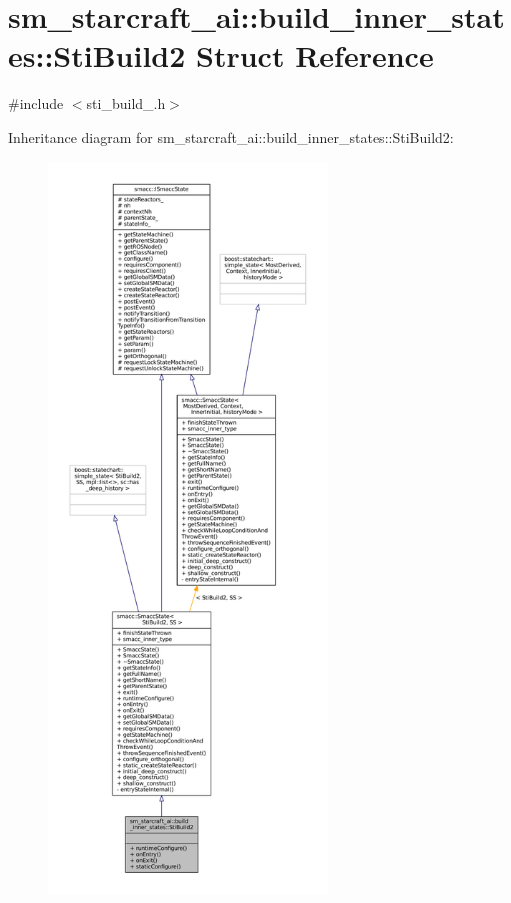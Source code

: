 \hypertarget{structsm__starcraft__ai_1_1build__inner__states_1_1StiBuild2}{}\section{sm\+\_\+starcraft\+\_\+ai\+:\+:build\+\_\+inner\+\_\+states\+:\+:Sti\+Build2 Struct Reference}
\label{structsm__starcraft__ai_1_1build__inner__states_1_1StiBuild2}


{\ttfamily \#include $<$sti\+\_\+build\+\_.\+h$>$}



Inheritance diagram for sm\+\_\+starcraft\+\_\+ai\+:\+:build\+\_\+inner\+\_\+states\+:\+:Sti\+Build2\+:
\nopagebreak
\begin{figure}[H]
\begin{center}
\leavevmode
\includegraphics[height=550pt]{structsm__starcraft__ai_1_1build__inner__states_1_1StiBuild2__inherit__graph}
\end{center}
\end{figure}



